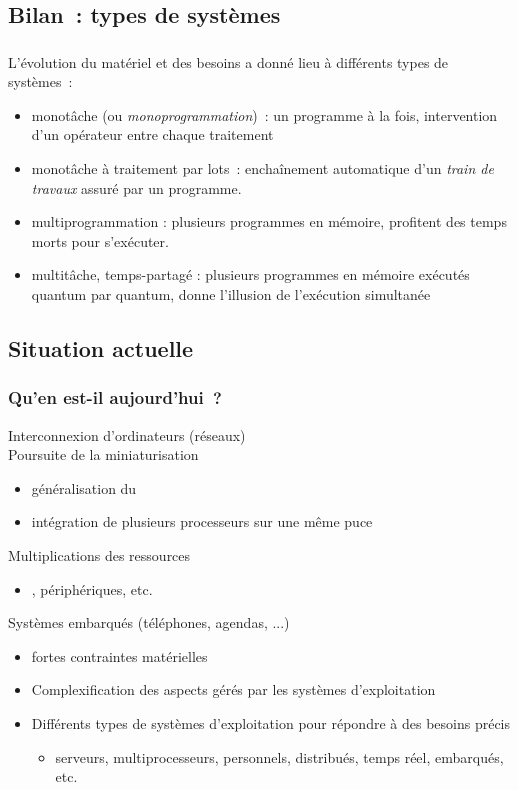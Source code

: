 \subsection{Bilan~: types de systèmes}
\begin{frame}
  \frametitle{\insertsubsection}
  L'évolution du matériel et des besoins a donné lieu à différents types de systèmes~:
  \begin{itemize}
  \item \alert{monotâche} (ou \emph{monoprogrammation})~: un programme à la fois,
    intervention d'un opérateur entre chaque traitement 
  \item \alert{monotâche à traitement par lots}~: enchaînement automatique d'un \emph{train de travaux}
    assuré par un programme.
  \item \alert{multiprogrammation} : plusieurs programmes en mémoire,
    profitent des temps morts pour s'exécuter.
  \item \alert{multitâche, temps-partagé} : plusieurs programmes en mémoire exécutés
    quantum par quantum, donne l'illusion de l'exécution simultanée
  \end{itemize}
\end{frame}



\subsection{Situation actuelle}

\begin{frame}
  \frametitle{Qu'en est-il aujourd'hui~?}
  Interconnexion d'ordinateurs (réseaux)\\
  Poursuite de la miniaturisation
  \begin{itemize}
  \item généralisation du \alert{\mc} 
  \item[\ding{212}] intégration de plusieurs processeurs sur une même puce
  \end{itemize}
  Multiplications des ressources
  \begin{itemize}
  \item \coeurs, périphériques, etc. 
  \end{itemize}
  \alert{Systèmes embarqués} (téléphones, agendas, ...) 
  \begin{itemize}
  \item fortes contraintes matérielles
  \end{itemize}
\vspace{0.3cm}
\begin{itemize}
\item[\ding{212}] Complexification des aspects gérés par les systèmes d'exploitation
\item[\ding{212}] Différents types de systèmes d'exploitation pour répondre à des besoins précis
\begin{itemize}
\item serveurs, multiprocesseurs, personnels, distribués, temps réel, embarqués, etc.  
\end{itemize}
\end{itemize}
\end{frame}

